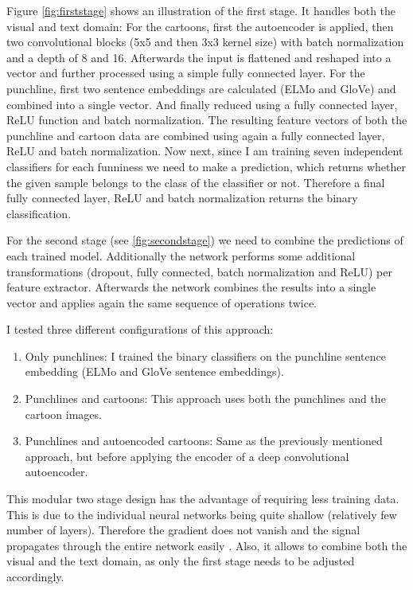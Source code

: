 \documentclass[draft,final,oneside]{vutinfth} %
\begin{document}
Figure \ref{fig:firststage} shows an illustration of the first stage. It handles both the visual and text domain: For the cartoons, first the autoencoder is applied, then two convolutional blocks (5x5 and then 3x3 kernel size) with batch normalization and a depth of 8 and 16. Afterwards the input is flattened and reshaped into a vector and further processed using a simple fully connected layer. For the punchline, first two sentence embeddings are calculated (ELMo and GloVe) and combined into a single vector. And finally reduced using a fully connected layer, ReLU function and batch normalization. The resulting feature vectors of both the punchline and cartoon data are combined using again a fully connected layer, ReLU and batch normalization. Now next, since I am training seven independent classifiers for each funniness we need to make a prediction, which returns whether the given sample belongs to the class of the classifier or not. Therefore a final fully connected layer, ReLU and batch normalization returns the binary classification.

For the second stage (see \ref{fig:secondstage}) we need to combine the predictions of each trained model. Additionally the network performs some additional transformations (dropout, fully connected, batch normalization and ReLU) per feature extractor. Afterwards the network combines the results into a single vector and applies again the same sequence of operations twice.

I tested three different configurations of this approach:

\begin{enumerate}

\item Only punchlines: I trained the binary classifiers on the punchline sentence embedding (ELMo and GloVe sentence embeddings).
\item Punchlines and cartoons: This approach uses both the punchlines and the cartoon images.
\item Punchlines and autoencoded cartoons: Same as the previously mentioned approach, but before applying the encoder of a deep convolutional autoencoder.

\end{enumerate}

This modular two stage design has the advantage of requiring less training data. This is due to the individual neural networks being quite shallow (relatively few number of layers). Therefore the gradient does not vanish and the signal propagates through the entire network easily \cite{vanishinggradient}. Also, it allows to combine both the visual and the text domain, as only the first stage needs to be adjusted accordingly.
\end{document}
